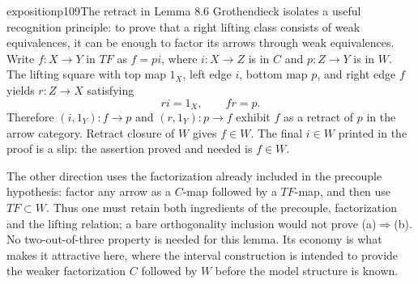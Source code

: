 \begin{dcomment}{exposition}{p109}{The retract in Lemma 8.6}
Grothendieck isolates a useful recognition principle: to prove that a right lifting class consists of weak equivalences, it can be enough to factor its arrows through weak equivalences. Write $f:X\to Y$ in $TF$ as $f=pi$, where $i:X\to Z$ is in $C$ and $p:Z\to Y$ is in $W$. The lifting square with top map $1_X$, left edge $i$, bottom map $p$, and right edge $f$ yields $r:Z\to X$ satisfying
\[
 ri=1_X,\qquad fr=p.
\]
Therefore $(i,1_Y):f\to p$ and $(r,1_Y):p\to f$ exhibit $f$ as a retract of $p$ in the arrow category. Retract closure of $W$ gives $f\in W$. The final $i\in W$ printed in the proof is a slip: the assertion proved and needed is $f\in W$.

The other direction uses the factorization already included in the precouple hypothesis: factor any arrow as a $C$-map followed by a $TF$-map, and then use $TF\subset W$. Thus one must retain both ingredients of the precouple, factorization and the lifting relation; a bare orthogonality inclusion would not prove (a)$\Rightarrow$(b). No two-out-of-three property is needed for this lemma. Its economy is what makes it attractive here, where the interval construction is intended to provide the weaker factorization $C$ followed by $W$ before the model structure is known.
\end{dcomment}

